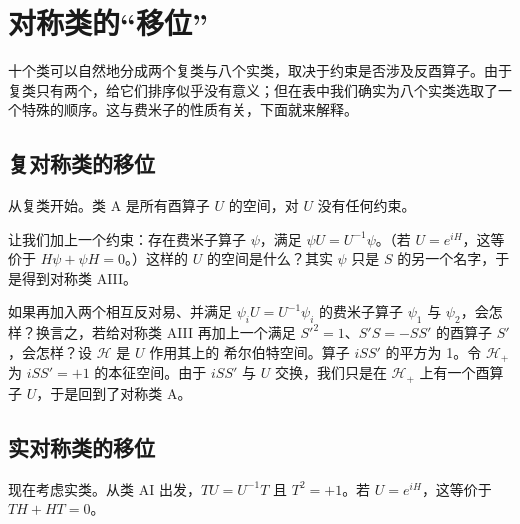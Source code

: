 
\section{对称类的“移位”}

十个类可以自然地分成两个复类与八个实类，取决于约束是否涉及反酉算子。由于复类只有两个，给它们排序似乎没有意义；但在表中我们确实为八个实类选取了一个特殊的顺序。这与费米子的性质有关，下面就来解释。

\subsection{复对称类的移位}

从复类开始。类 A 是所有酉算子 $U$ 的空间，对 $U$ 没有任何约束。

让我们加上一个约束：存在费米子算子 $\psi$，满足 $\psi U=U^{-1}\psi$。（若 $U=e^{iH}$，这等价于 $H\psi+\psi H=0$。）这样的 $U$ 的空间是什么？其实 $\psi$ 只是 $S$ 的另一个名字，于是得到对称类 AIII。

如果再加入两个相互反对易、并满足 $\psi_iU=U^{-1}\psi_i$ 的费米子算子 $\psi_1$ 与 $\psi_2$，会怎样？换言之，若给对称类 AIII 再加上一个满足 $S'^2=1$、$S'S=-SS'$ 的酉算子 $S'$，会怎样？设 $\mathcal{H}$ 是 $U$ 作用其上的 希尔伯特空间。算子 $iSS'$ 的平方为 1。令 $\mathcal{H}_+$ 为 $iSS'=+1$ 的本征空间。由于 $iSS'$ 与 $U$ 交换，我们只是在 $\mathcal{H}_+$ 上有一个酉算子 $U$，于是回到了对称类 A。

\subsection{实对称类的移位}

现在考虑实类。从类 AI 出发，$TU=U^{-1}T$ 且 $T^2=+1$。若 $U=e^{iH}$，这等价于 $TH+HT=0$。

